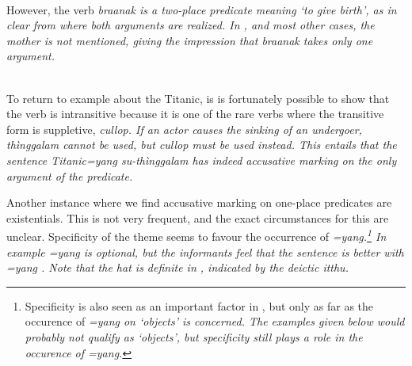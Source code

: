  \\
However, the verb \em braanak \em is a two-place predicate meaning `to give birth', as in clear from  where both arguments are realized. In , and most other cases, the mother is not mentioned, giving the impression that \em braanak \em takes only one argument.

 \\
To return to example  about the Titanic, is is fortunately possible to show that the verb  is intransitive because it is one of the rare verbs where the transitive form is suppletive, \em cullop\em. If an actor causes the sinking of an undergoer, \em thìnggalam \em cannot be used, but \em cullop \em must be used instead. This entails that the sentence \em Titanic=yang su-thìnggalam \em has indeed accusative marking on the only argument of the predicate.
% 
% 
% 
% 
% 

Another instance where we find accusative marking on one-place predicates are existentials. This is not very frequent, and the exact circumstances for this are unclear. Specificity of the theme seems to favour the occurrence of \em =yang\em.\footnote{Specificity is also seen as an important factor in \citet{Ansaldo2005ms}, but only as far as the occurence of \em =yang \em on `objects' is concerned. The examples given below would probably not qualify as `objects', but specificity still plays a role in the occurence of \em =yang\em.} In example  \em =yang \em is optional, but the informants feel that the sentence is better with \em =yang \em. Note that the hat is definite in , indicated by the deictic \em itthu\em.
 \\



